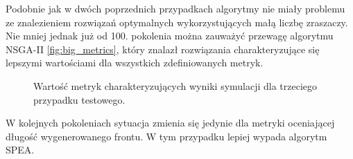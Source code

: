 \documentclass[twoside]{iisthesis}
\begin{document}
Podobnie jak w dwóch poprzednich przypadkach algorytmy nie miały problemu ze znalezieniem rozwiązań optymalnych wykorzystujących małą liczbę zraszaczy. Nie mniej jednak już od 100. pokolenia można zauważyć przewagę algorytmu NSGA-II \eqref{fig:big_metrics}, który znalazł rozwiązania charakteryzujące się lepszymi wartościami dla wszystkich zdefiniowanych metryk.
\begin{figure}\centering
{}
    \hfill
{}

    \hfill
{}
\caption{Wartość metryk charakteryzujących wyniki symulacji dla trzeciego przypadku testowego.}
    \label{fig:big_metrics}
\end{figure}
W kolejnych pokoleniach sytuacja zmienia się jedynie dla metryki oceniającej długość wygenerowanego frontu. W tym przypadku lepiej wypada algorytm SPEA.
\end{document}
